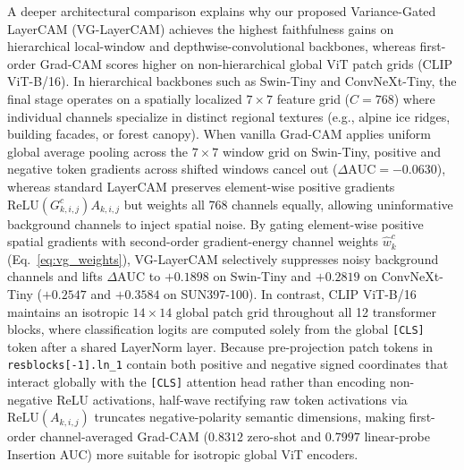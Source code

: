 \documentclass[final,5p,times,twocolumn]{elsarticle}
\begin{document}
A deeper architectural comparison explains why our proposed Variance-Gated LayerCAM (VG-LayerCAM) achieves the highest faithfulness gains on hierarchical local-window and depthwise-convolutional backbones, whereas first-order Grad-CAM scores higher on non-hierarchical global ViT patch grids (CLIP ViT-B/16). In hierarchical backbones such as Swin-Tiny and ConvNeXt-Tiny, the final stage operates on a spatially localized $7\times7$ feature grid ($C=768$) where individual channels specialize in distinct regional textures (e.g., alpine ice ridges, building facades, or forest canopy). When vanilla Grad-CAM applies uniform global average pooling across the $7\times7$ window grid on Swin-Tiny, positive and negative token gradients across shifted windows cancel out ($\Delta\text{AUC} = -0.0630$), whereas standard LayerCAM preserves element-wise positive gradients $\text{ReLU}(G_{k,i,j}^c)A_{k,i,j}$ but weights all 768 channels equally, allowing uninformative background channels to inject spatial noise. By gating element-wise positive spatial gradients with second-order gradient-energy channel weights $\hat{w}_k^c$ (Eq.~\ref{eq:vg_weights}), VG-LayerCAM selectively suppresses noisy background channels and lifts $\Delta\text{AUC}$ to $+0.1898$ on Swin-Tiny and $+0.2819$ on ConvNeXt-Tiny ($+0.2547$ and $+0.3584$ on SUN397-100). In contrast, CLIP ViT-B/16 maintains an isotropic $14\times14$ global patch grid throughout all 12 transformer blocks, where classification logits are computed solely from the global \texttt{[CLS]} token after a shared LayerNorm layer. Because pre-projection patch tokens in \texttt{resblocks[-1].ln\_1} contain both positive and negative signed coordinates that interact globally with the \texttt{[CLS]} attention head rather than encoding non-negative ReLU activations, half-wave rectifying raw token activations via $\text{ReLU}(A_{k,i,j})$ truncates negative-polarity semantic dimensions, making first-order channel-averaged Grad-CAM ($0.8312$ zero-shot and $0.7997$ linear-probe Insertion AUC) more suitable for isotropic global ViT encoders.
\end{document}
